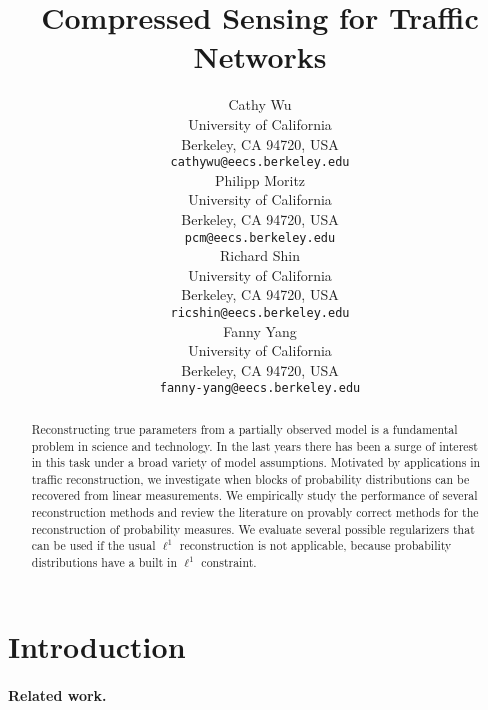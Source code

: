 \documentclass{article} %
\begin{document}
\title{Compressed Sensing for Traffic Networks}

\author{
Cathy Wu\\
University of California\\
Berkeley, CA 94720, USA\\
\texttt{cathywu@eecs.berkeley.edu}\\
\And
Philipp Moritz\\
University of California\\
Berkeley, CA 94720, USA\\
\texttt{pcm@eecs.berkeley.edu}\\
\And
Richard Shin\\
University of California\\
Berkeley, CA 94720, USA\\
\texttt{ricshin@eecs.berkeley.edu}\\
\And
Fanny Yang\\
University of California\\
Berkeley, CA 94720, USA\\
\texttt{fanny-yang@eecs.berkeley.edu} \\
}

\maketitle

\begin{abstract}
Reconstructing true parameters from a partially observed model is a fundamental problem in science and technology.
In the last years there has been a surge of interest in this task under a broad variety of model assumptions.
Motivated by applications in traffic reconstruction, we investigate when blocks of probability distributions can be recovered from linear measurements.
We empirically study the performance of several reconstruction methods and review the literature on provably correct methods for the reconstruction of probability measures.
We evaluate several possible regularizers that can be used if the usual $\ell^1$ reconstruction is not applicable, because probability distributions have a built in $\ell^1$ constraint.
\end{abstract}

\section{Introduction}
\paragraph{Related work.}
\end{document}
